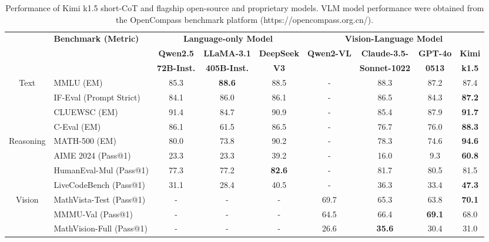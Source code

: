\documentclass{article}
\begin{document}
\begin{table}[h]
    \centering
    \footnotesize
    \setlength{\tabcolsep}{2.5pt}
    \begin{tabular}{@{}c l | c c c | c c c  c@{}}
    \toprule
    & \multirow{3}{*}{\centering \textbf{Benchmark {\tiny (Metric)}}} 
    & \multicolumn{3}{c|}{\textbf{Language-only Model}} 
    & \multicolumn{4}{c}{\textbf{Vision-Language Model}} \\ 
    & & \textbf{Qwen2.5} & \textbf{LLaMA-3.1} & \textbf{DeepSeek} & \textbf{Qwen2-VL} & \textbf{Claude-3.5-} & \textbf{GPT-4o}  & \textbf{Kimi} \\
    & & \textbf{72B-Inst.} & \textbf{405B-Inst.} & \textbf{V3}  & & \textbf{Sonnet-1022} & \textbf{0513} & \textbf{k1.5} \\
    \midrule
    
    \multirow{4}{*}{Text}
    & MMLU {\tiny (EM)}   & 85.3 & \textbf{88.6} & 88.5 & - & 88.3 & 87.2 & 87.4 \\
    & IF-Eval {\tiny (Prompt Strict)}  & 84.1 & 86.0 & 86.1 & - & 86.5 & 84.3 & \textbf{87.2} \\
    & CLUEWSC  {\tiny (EM)} & 91.4 & 84.7 & 90.9 & - & 85.4 & 87.9 & \textbf{91.7} \\
    & C-Eval  {\tiny (EM)}  & 86.1 & 61.5 & 86.5 & - & 76.7 & 76.0 & \textbf{88.3} \\
    \midrule
    
    \multirow{4}{*}{Reasoning} 
    & MATH-500 {\tiny (EM)} & 80.0 & 73.8 & 90.2 & - & 78.3 & 74.6 & \textbf{94.6} \\
    & AIME 2024 {\tiny (Pass@1)} & 23.3 & 23.3 & 39.2 & - & 16.0 & 9.3 & \textbf{60.8} \\
    & HumanEval-Mul {\tiny (Pass@1)}  & 77.3 & 77.2 & \textbf{82.6} & - & 81.7 & 80.5 & 81.5 \\
    & LiveCodeBench {\tiny (Pass@1)} & 31.1 & 28.4 & 40.5 & - & 36.3 & 33.4 & \textbf{47.3} \\
    \midrule
    
    \multirow{3}{*}{Vision} 
    & MathVista-Test {\tiny (Pass@1)} & - & - & - & 69.7 & 65.3 & 63.8 & \textbf{70.1} \\
    & MMMU-Val {\tiny (Pass@1)} & - & - & - & 64.5 & 66.4 & \textbf{69.1} & 68.0 \\
    & MathVision-Full {\tiny (Pass@1)} & - & - & - & 26.6 & \textbf{35.6} & 30.4 & 31.0 \\
 
    \bottomrule
    \end{tabular}
    \vspace{1em}
    \caption{Performance of Kimi k1.5 short-CoT and flagship open-source and proprietary models. VLM model performance were obtained from the OpenCompass benchmark platform (https://opencompass.org.cn/).}
    \label{tab:short_perf}
\end{table}
\end{document}
